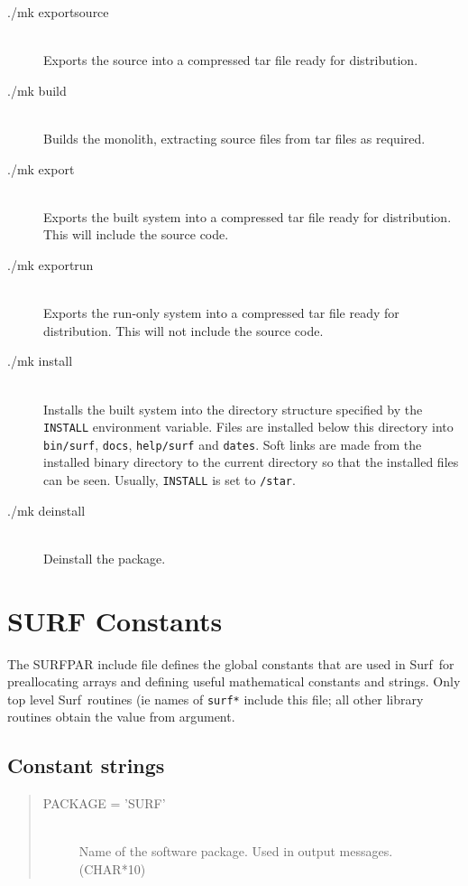 \documentclass[twoside,11pt]{article}
\newcommand{\scusoft}          {{\sc Surf}}
\renewcommand{\_}{\texttt{\symbol{95}}}
\begin{document}
\begin{description}

\item[./mk export\_source] \mbox{} \\
   Exports the source into a compressed tar file ready for distribution.
\item[./mk build] \mbox{} \\
   Builds the monolith, extracting source files from tar files as required.
\item[./mk export] \mbox{} \\
   Exports the built system into a compressed tar file ready for distribution.
This will include the source code.
\item[./mk export\_run] \mbox{} \\
   Exports the run-only system into a compressed tar file ready for
distribution. This will not include the source code.
\item[./mk install] \mbox{} \\
  Installs the built system into the directory structure specified by the
\texttt{INSTALL} environment variable. Files are installed below this
directory into \texttt{bin/surf}, \texttt{docs}, \texttt{help/surf}
and \texttt{dates}. Soft links are made from the installed binary directory
to the current directory so that the installed files can be seen.
Usually, \texttt{INSTALL} is set to \texttt{/star}.
\item[./mk deinstall] \mbox{} \\
  Deinstall the package.
\end{description}

\section{SURF Constants\label{app:const}}

The SURF\_PAR include file defines the global constants that are used
in \scusoft\ for preallocating arrays and defining useful mathematical 
constants and strings. Only top level \scusoft\ routines (ie names of
\texttt{surf\_*} include this file; all other library routines 
obtain the value from argument.

\subsection{Constant strings}

\begin{quote}
\begin{description}
  \item[PACKAGE = 'SURF'] \mbox{} \\
    Name of the software package. Used in output messages. (CHAR*10)
\end{description}
\end{quote}
\end{document}
